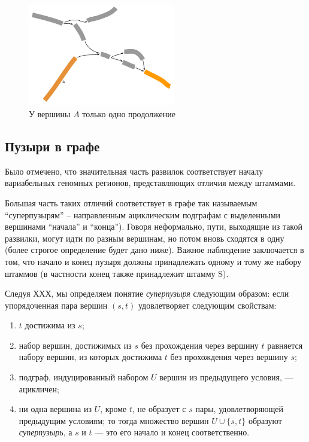 \documentclass{spbau-diploma}
\begin{document}
\begin{figure}[t]
\centering
\includegraphics[width=0.57\textwidth]{pics/one_continue.png}
\caption{У вершины $A$ только одно продолжение}
\label{one_continue}
\end{figure}


\subsection{Пузыри в графе}

Было отмечено, что значительная часть развилок соответствует началу вариабельных геномных регионов, представляющих отличия между штаммами.

Большая часть таких отличий соответствует в графе так называемым “суперпузырям” -- направленным ациклическим подграфам с выделенными вершинами “начала” и “конца”). Говоря неформально, пути, выходящие из такой развилки, могут идти по разным вершинам, но потом вновь сходятся в одну (более строгое определение будет дано ниже). Важное наблюдение заключается в том, что начало и конец пузыря должны принадлежать одному и тому же набору штаммов (в частности конец также принадлежит штамму S). 

Следуя ХХХ, мы определяем понятие \textit{суперпузыря} следующим образом: если упорядоченная пара вершин $(s,t)$ удовлетворяет следующим свойствам:
\begin{enumerate}
    \item $t$ достижима из $s$;
    \item набор вершин, достижимых из $s$ без прохождения через вершину $t$ равняется набору вершин, из которых достижима $t$ без прохождения через вершину $s$;
    \item подграф, индуцированный набором $U$ вершин из предыдущего условия, --- ацикличен;
    \item ни одна вершина из $U$, кроме $t$, не образует с $s$ пары, удовлетворяющей предыдущим условиям; то тогда множество вершин $U \cup \{s,t\}$ образуют \textit{суперпузырь}, а $s$ и $t$ --- это его начало и конец соответственно. 
\end{enumerate}
\end{document}
